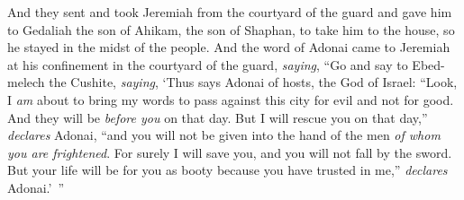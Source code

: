 \begin{biblechapter}
\verse And they sent and took Jeremiah from the courtyard of the guard and gave him to Gedaliah the son of Ahikam, the son of Shaphan, to take him to the house, so he stayed in the midst of the people.
 And the word of Adonai came to Jeremiah at his confinement in the courtyard of the guard, \textit{saying},
\verse “Go and say to Ebed-melech the Cushite, \textit{saying}, ‘Thus says Adonai of hosts, the God of Israel: “Look, I \textit{am} about to bring my words to pass against this city for evil and not for good. And they will be \textit{before you} on that day.
\verse But I will rescue you on that day,” \textit{declares} Adonai, “and you will not be given into the hand of the men \textit{of whom you are frightened}.
\verse For surely I will save you, and you will not fall by the sword. But your life will be for you as booty because you have trusted in me,” \textit{declares} Adonai.’ ”
\end{biblechapter}

